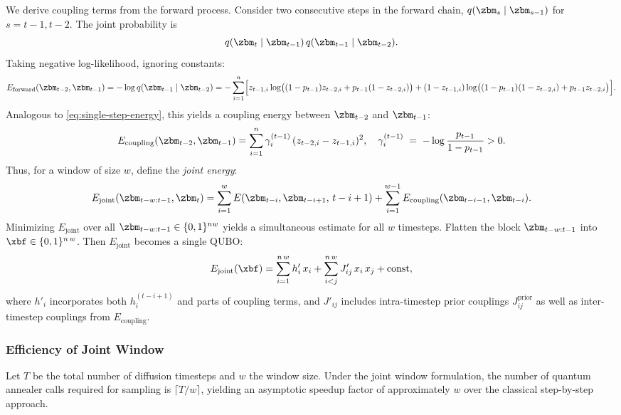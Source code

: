 \documentclass[11pt,letterpaper]{article}
\begin{document}
We derive coupling terms from the forward process. Consider two consecutive steps in the forward chain, $q(\zbm_{s} \mid \zbm_{s-1})$ for $s=t-1,t-2$. The joint probability is
\[
q(\zbm_{t} \mid \zbm_{t-1})\,q(\zbm_{t-1} \mid \zbm_{t-2}).
\]
Taking negative log-likelihood, ignoring constants:
\begin{equation}
E_{\text{forward}}(\zbm_{t-2}, \zbm_{t-1})
= -\log q(\zbm_{t-1} \mid \zbm_{t-2})
= -\sum_{i=1}^n \Bigl[z_{t-1,i}\log\bigl((1-p_{t-1})z_{t-2,i} + p_{t-1}(1-z_{t-2,i})\bigr)
+ (1-z_{t-1,i})\log\bigl((1-p_{t-1})(1-z_{t-2,i}) + p_{t-1}z_{t-2,i}\bigr)\Bigr].
\end{equation}
Analogous to \eqref{eq:single-step-energy}, this yields a coupling energy between $\zbm_{t-2}$ and $\zbm_{t-1}$:
\[
E_{\text{coupling}}(\zbm_{t-2}, \zbm_{t-1})
= \sum_{i=1}^n \gamma_i^{(t-1)} \,(z_{t-2,i} - z_{t-1,i})^2,
\quad \gamma_i^{(t-1)} \;=\; -\log\frac{p_{t-1}}{1-p_{t-1}}>0.
\]
Thus, for a window of size $w$, define the \emph{joint energy}:
\begin{equation}
E_{\text{joint}}(\zbm_{t-w:t-1}, \zbm_t)
= \sum_{i=1}^w E(\zbm_{t-i}, \zbm_{t-i+1},\,t-i+1)
+ \sum_{i=1}^{w-1} E_{\text{coupling}}(\zbm_{t-i-1}, \zbm_{t-i}).
\label{eq:joint-energy}
\end{equation}
Minimizing $E_{\text{joint}}$ over all $\zbm_{t-w:t-1}\in\{0,1\}^{nw}$ yields a simultaneous estimate for all $w$ timesteps. Flatten the block $\zbm_{t-w:t-1}$ into $\xbf\in\{0,1\}^{n\,w}$. Then $E_{\text{joint}}$ becomes a single QUBO:
\[
E_{\text{joint}}(\xbf) 
= \sum_{i=1}^{n\,w} h'_i\,x_i 
+ \sum_{i<j}^{n\,w} J'_{ij}\,x_i\,x_j 
+ \mathrm{const},
\]
where $h'_i$ incorporates both $h_i^{(t-i+1)}$ and parts of coupling terms, and $J'_{ij}$ includes intra-timestep prior couplings $J_{ij}^{\text{prior}}$ as well as inter-timestep couplings from $E_{\text{coupling}}$.

\subsubsection{Efficiency of Joint Window}
\begin{theorem}
\label{thm:efficiency}
Let $T$ be the total number of diffusion timesteps and $w$ the window size. Under the joint window formulation, the number of quantum annealer calls required for sampling is $\lceil T / w \rceil$, yielding an asymptotic speedup factor of approximately $w$ over the classical step-by-step approach.
\end{theorem}
\end{document}
